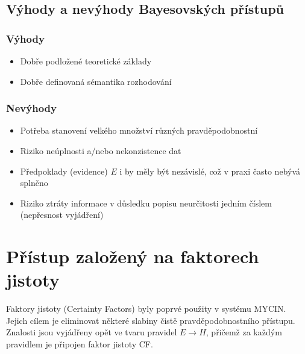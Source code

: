\documentclass[12pt]{article}
\begin{document}
\subsection{Výhody a nevýhody Bayesovských přístupů}
\subsubsection*{Výhody}
\begin{itemize}
\item Dobře podložené teoretické základy
\item Dobře definovaná sémantika rozhodování
\end{itemize}
\subsubsection*{Nevýhody}
\begin{itemize}
\item Potřeba stanovení velkého množství různých pravděpodobnostní
\item Riziko neúplnosti a/nebo nekonzistence dat
\item Předpoklady (evidence) $E$ i by měly být nezávislé, což v praxi často nebývá splněno
\item Riziko ztráty informace v důsledku popisu neurčitosti jedním číslem (ne\-přesnost vyjá\-dření)
\end{itemize}


\section{Přístup založený na faktorech jistoty}
Faktory jistoty (Certainty Factors) byly poprvé použity v systému MYCIN. Jejich cílem je eliminovat některé slabiny čistě pravděpodobnostního přístupu. Znalosti jsou vyjádřeny opět ve tvaru pravidel $E\rightarrow H$, přičemž za každým pravidlem je připojen faktor jistoty CF.
\end{document}
